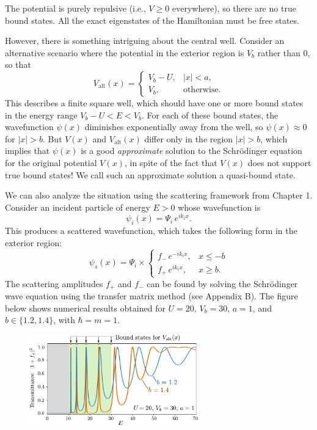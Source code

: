 \documentclass[pra,12pt]{revtex4}
\begin{document}
\noindent
The potential is purely repulsive (i.e., $V \ge 0$ everywhere), so
there are no true bound states.  All the exact eigenstates of the
Hamiltonian must be free states.

However, there is something intriguing about the central well.
Consider an alternative scenario where the potential in the exterior
region is $V_b$ rather than $0$, so that
\begin{equation}
  V_{\mathrm{alt}}(x) = \begin{cases}V_b - U, & |x| < a, \\ V_b, & \mathrm{otherwise}.\end{cases}
\end{equation}
This describes a finite square well, which should have one or more
bound states in the energy range $V_b-U < E < V_b$.  For each of these
bound states, the wavefunction $\psi(x)$ diminishes exponentially away
from the well, so $\psi(x) \approx 0$ for $|x| > b$.  But $V(x)$ and
$V_{\mathrm{alt}}(x)$ differ only in the region $|x| > b$, which
implies that $\psi(x)$ is a good \textit{approximate} solution to the
Schr\"odinger equation for the original potential $V(x)$, in spite of
the fact that $V(x)$ does not support true bound states!  We call such
an approximate solution a quasi-bound state.

We can also analyze the situation using the scattering framework from
Chapter 1.  Consider an incident particle of energy $E > 0$ whose
wavefunction is
\begin{equation}
  \psi_i(x) = \Psi_i \, e^{ik_i x}.
\end{equation}
This produces a scattered wavefunction, which takes the following form
in the exterior region:
\begin{equation}
  \psi_s(x) = \Psi_i \times \begin{cases}f_- \,e^{-ik_ix}, & x \le -b \\ f_+ \,e^{ik_ix}, & x \ge b.\end{cases}
\end{equation}
The scattering amplitudes $f_+$ and $f_-$ can be found by solving the
Schr\"odinger wave equation using the transfer matrix method (see
Appendix B).  The figure below shows numerical results obtained for $U
= 20,\,V_b = 30,\,a=1$, and $b \in \{ 1.2, 1.4\}$, with $\hbar = m =
1$.

\begin{figure}[h]
  \centering\includegraphics[width=0.65\textwidth]{resonances}
\end{figure}
\end{document}
